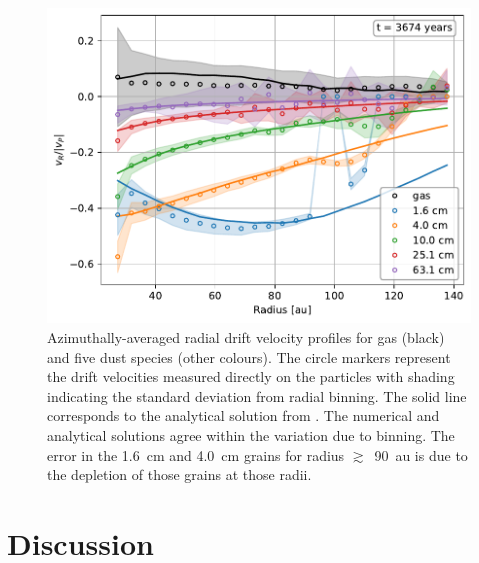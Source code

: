 \documentclass[fleqn,usenatbib]{mnras}
\begin{document}
\begin{figure}
   \begin{center}
      \includegraphics[width=\columnwidth]{figs/radialdrift.pdf}
      \caption{Azimuthally-averaged radial drift velocity profiles for gas
      (black) and five dust species (other colours). The circle markers
      represent the drift velocities measured directly on the particles with
      shading indicating the standard deviation from radial binning. The solid
      line corresponds to the analytical solution from
      \citet{Dipierro2018MNRAS.479.4187D}. The numerical and analytical
      solutions agree within the variation due to binning. The error in the
      1.6~cm and 4.0~cm grains for radius \(\gtrsim\)~90~au is due to the
      depletion of those grains at those radii.%
      \label{fig:radialdrift}}
   \end{center}
\end{figure}


\section{Discussion}%
\label{sec:discussion}
\end{document}
